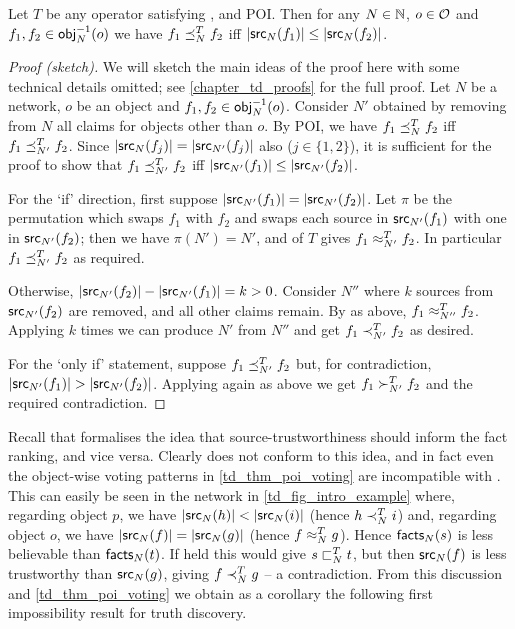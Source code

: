 \begin{theorem}
\label{td_thm_poi_voting}
    Let $T$ be any operator satisfying \symmetry{}, \monotonicity{} and POI. Then for any
$N \in \mathbb{N}$, $o \in \mathcal{O}$ and $f_1, f_2 \in \mathsf{obj}_N^{-1}(o)$ we have $f_1 \preceq_N^T
f_2$ iff $|\mathsf{src}_N(f_1)| \le |\mathsf{src}_N(f_2)|$.
\end{theorem}

\begin{proof}[Proof (sketch)]

We will sketch the main ideas of the proof here with some technical details
omitted; see \cref{chapter_td_proofs} for the full proof. Let $N$ be a
network, $o$ be an object and $f_1, f_2 \in \mathsf{obj}_N^{-1}(o)$. Consider $N'$
obtained by removing from $N$ all claims for objects other than $o$. By POI, we
have $f_1 \preceq_N^T f_2$ iff $f_1 \preceq_{N'}^T f_2$.  Since $|\mathsf{src}_N(f_j)| =
|\mathsf{src}_{N'}(f_j)|$ also ($j \in \{1,2\}$), it is sufficient for the proof to
show that $f_1 \preceq_{N'}^T f_2$ iff $|\mathsf{src}_{N'}(f_1)| \le |\mathsf{src}_{N'}(f_2)|$.

For the `if' direction, first suppose $|\mathsf{src}_{N'}(f_1)| = |\mathsf{src}_{N'}(f_2)|$.
Let $\pi$ be the permutation which swaps $f_1$ with $f_2$ and swaps each source
in $\mathsf{src}_{N'}(f_1)$ with one in $\mathsf{src}_{N'}(f_2)$; then we have $\pi(N') = N'$,
    and \symmetry{} of $T$ gives $f_1 \approx_{N'}^T f_2$. In particular $f_1 \preceq_{N'}^T
f_2$ as required.

Otherwise, $|\mathsf{src}_{N'}(f_2)| - |\mathsf{src}_{N'}(f_1)| = k > 0$. Consider $N''$ where
$k$ sources from $\mathsf{src}_{N'}(f_2)$ are removed, and all other claims remain. By
    \symmetry{} as above, $f_1 \approx_{N''}^T f_2$. Applying \monotonicity{} $k$ times we
can produce $N'$ from $N''$ and get $f_1 \prec_{N'}^T f_2$ as desired.

For the `only if' statement, suppose $f_1 \preceq_{N'}^T f_2$ but, for
    contradiction, $|\mathsf{src}_{N'}(f_1)| > |\mathsf{src}_{N'}(f_2)|$. Applying
    \monotonicity{}
again as above we get $f_1 \succ_{N'}^T f_2$ and the required contradiction.
\end{proof}

Recall that \coherence{} formalises the idea that source-trustworthiness should
inform the fact ranking, and vice versa. Clearly \voting{} does not conform to
this idea, and in fact even the object-wise voting patterns in
\cref{td_thm_poi_voting} are incompatible with \coherence{}. This can easily be seen
in the network in \cref{td_fig_intro_example} where, regarding object $p$, we have
$|\mathsf{src}_N(h)| < |\mathsf{src}_N(i)|$ (hence $h \prec^T_N i$) and, regarding object $o$,
we have $|\mathsf{src}_N(f)| = |\mathsf{src}_N(g)|$ (hence $f \approx^T_N g$). Hence $\mathsf{facts}_N(s)$
    is less believable than $\mathsf{facts}_N(t)$. If \coherence{} held this would give $s
\sqsubset_N^T t$, but then $\mathsf{src}_N(f)$ is less trustworthy than $\mathsf{src}_N(g)$, giving
$f \prec_N^T g$ -- a contradiction. From this discussion and
\cref{td_thm_poi_voting} we obtain as a corollary the following first
impossibility result for truth discovery.

